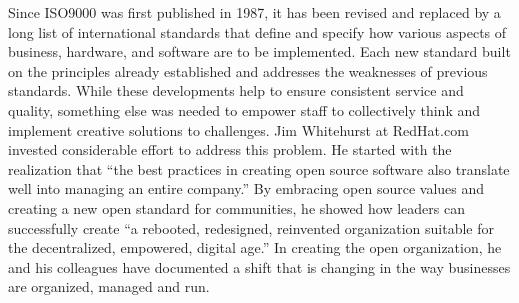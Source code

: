 \documentclass[]{book}
\begin{document}
Since ISO9000 was first published in 1987, it has been revised and replaced by a long list of international standards that define and specify how various aspects of business, hardware, and software are to be implemented. Each new standard built on the principles already established and addresses the weaknesses of previous standards. \citep{ISO2015} While these developments help to ensure consistent service and quality, something else was needed to empower staff to collectively think and implement creative solutions to challenges. Jim Whitehurst at RedHat.com invested considerable effort to address this problem. He started with the realization that ``the best practices in creating open source software also translate well into managing an entire company.'' By embracing open source values and creating a new open standard for communities, he showed how leaders can successfully create ``a rebooted, redesigned, reinvented organization suitable for the decentralized, empowered, digital age.''\citep{Whitehurst2015} In creating the open organization, he and his colleagues have documented a shift that is changing in the way businesses are organized, managed and run.
\end{document}
